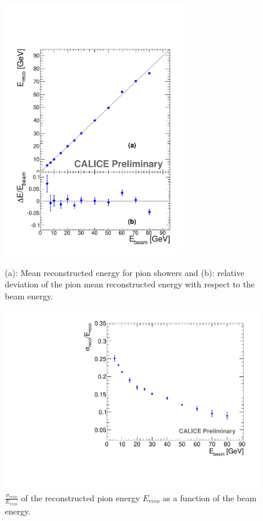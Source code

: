 \begin{figure}
    \centering
 \begin{minipage}[t]{0.49\textwidth}
 \includegraphics*[width=0.7\textwidth,keepaspectratio]{Calorimeter/SDHCAL_GRPC/figures/Energy-Linearity-BEST.pdf}
	\caption{(a): Mean reconstructed energy for pion showers and (b): relative deviation of the pion mean reconstructed energy with respect to the beam energy.}
 \label{fig:Calorimeter:SDHCAL_GRPC:Linearity}
 \end{minipage}
\hfill
 \begin{minipage}[t]{0.49\textwidth}
 \includegraphics*[width=\textwidth,keepaspectratio]{Calorimeter/SDHCAL_GRPC/figures/Energy-Resolution-BEST.pdf}
 \caption{ $\frac{\sigma_{reco}}{E_{reco}}$ of the reconstructed pion energy $E_{reco}$ as a function of the beam energy. }
 \label{fig:Calorimeter:SDHCAL_GRPC:Resolution}
 \end{minipage}
 \end{figure}


